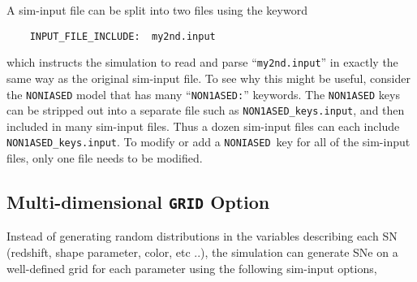 \documentclass[12pt]{article}
\newcommand{\NONIA}{{\tt NONIASED}}
\begin{document}
A sim-input file can be split into two files
using the keyword 
\begin{verbatim}
    INPUT_FILE_INCLUDE:  my2nd.input
\end{verbatim}
%
which instructs the simulation to read and parse
``{\tt my2nd.input}'' in exactly the same way as
the original sim-input file. To see why this might
be useful, consider the {\NONIA} model that has
many ``{\tt NON1ASED:}'' keywords. 
The {\tt NON1ASED} keys can be stripped out into a separate 
file such as {\tt NON1ASED\_keys.input}, and then included
in many sim-input files. 
Thus a dozen sim-input files can each include
{\tt NON1ASED\_keys.input}.
To modify or add a \NONIA\ key for all of the 
sim-input files, only one file needs to be modified.


   \clearpage
   \subsection{Multi-dimensional {\tt GRID} Option}
   \label{ssec:grid}

\newcommand{\SNPARINFO}{SNPAR-INFO}
\newcommand{\ILC}{ILC}
\newcommand{\MAGPACK}{1000}


Instead of generating random distributions in the
variables describing each SN 
(redshift, shape parameter, color, etc ..),
the simulation can generate SNe on a well-defined
grid for each parameter using the following sim-input
options,
\end{document}
